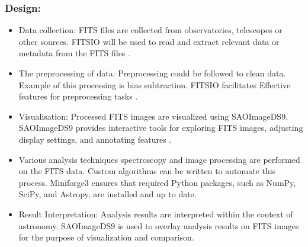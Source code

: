 \documentclass[a4paper,oneside,11pt]{book}
\begin{document}
\subsubsection{Design:}
\begin{itemize}
    \item Data collection: FITS files are collected from observatories, telescopes or other sources. FITSIO will be used to read and extract relevant data or metadata from the FITS files \citep{li2005introduction}.
    \item The preprocessing of data: Preprocessing could be followed to clean data. Example of this processing is bias subtraction. FITSIO facilitates Effective features  for preprocessing tasks \citep{li2005introduction}.
    \item Visualisation: Processed FITS images are visualized using SAOImageDS9. SAOImageDS9 provides interactive tools for exploring FITS images, adjusting display settings, and annotating features \citep{SAOimageDSFeatures}.
    \item Various analysis techniques spectroscopy and image processing are performed on the FITS data. Custom algorithms can be written to automate this process. Miniforge3 ensures that required Python packages, such as NumPy, SciPy, and Astropy, are installed and up to date.
    \item Result Interpretation: Analysis results are interpreted within the context of astronomy. SAOImageDS9 is used to overlay analysis results on FITS images for the purpose of visualization and comparison.
\end{itemize}
\newpage
\end{document}

